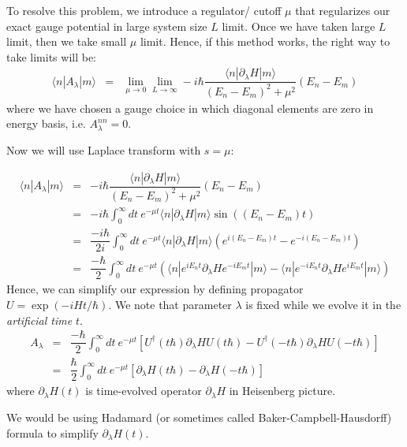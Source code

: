 \documentclass[11pt,a4paper]{article}
\begin{document}
 
To resolve this problem, we introduce a regulator/ cutoff $\mu$ that regularizes our exact gauge potential in large system size $L$ limit. Once we have taken large $L$ limit, then we take small $\mu$ limit. Hence, if this method works, the right way to take limits will be:
\begin{eqnarray}
\langle n | A_{\lambda} | m \rangle &=& \lim_{\mu \rightarrow 0} \lim_{L \rightarrow \infty } -i \hbar \dfrac{\langle n | \partial_{\lambda}H  | m \rangle}{(E_n-E_m)^2 + \mu^2} (E_n-E_m) 
\label{off-digonal}
\end{eqnarray}
where we have chosen a gauge choice in which diagonal elements are zero in energy basis, i.e. $A_{\lambda}^{nn}=0$.

Now we will use Laplace transform with $s=\mu$:

\begin{eqnarray}
\langle n | A_{\lambda} | m \rangle &=&   -i \hbar\dfrac{\langle n | \partial_{\lambda}H  | m \rangle}{(E_n-E_m)^2 + \mu^2} (E_n-E_m) \\
&=& -i \hbar  \int^{\infty}_{0} dt\ e^{-\mu t} \langle n | \partial_{\lambda}H  | m \rangle \sin((E_n-E_m)t) \\
&=& \dfrac{-i \hbar}{2i}  \int^{\infty}_{0} dt\ e^{-\mu t} \langle n | \partial_{\lambda}H  | m \rangle \left( e^{i(E_n-E_m)t} - e^{-i(E_n-E_m)t} \right) \\
&=& \dfrac{ -\hbar}{2}  \int^{\infty}_{0} dt\ e^{-\mu t}  \left(  \langle n | e^{iE_nt} \partial_{\lambda}H   e^{-i E_m t} | m \rangle  -  \langle n |e^{-i E_n t}  \partial_{\lambda}H  e^{ i E_mt} | m \rangle  \right) 
\end{eqnarray}
Hence, we can simplify our expression by defining propagator  $U= \exp(-i H t/ \hbar)$. We note that parameter $\lambda$ is fixed while we evolve it in the \textit{artificial time} $t$.
\begin{eqnarray}
A_{\lambda} &=& \dfrac{-\hbar}{2 }\int_0^{\infty} dt\ e^{-\mu t} [U^{\dagger}(t \hbar) \partial_{\lambda} H U(t  \hbar) - U^{\dagger}(-t  \hbar) \partial_{\lambda}H U(-t \hbar)]  \\
&=& \dfrac{\hbar}{2 }\int_0^{\infty} dt\ e^{-\mu t} [ \partial_{\lambda} H (t \hbar) -  \partial_{\lambda}H (-t  \hbar)  ]  
\end{eqnarray}
where $\partial_{\lambda}H (t)$ is time-evolved operator $\partial_{\lambda}H$ in Heisenberg picture.

We would be using  Hadamard (or sometimes called Baker-Campbell-Hausdorff) formula to simplify $\partial_{\lambda}H (t)$.
\end{document}
